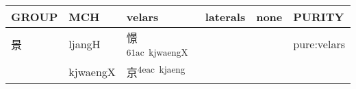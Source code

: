 \documentclass[14pt,a4paper]{scrartcl}
\begin{document}
\begin{longtable}[c]{@{}llllll@{}}
\toprule
\begin{minipage}[b]{0.14\columnwidth}\raggedright\strut
GROUP
\strut\end{minipage} &
\begin{minipage}[b]{0.14\columnwidth}\raggedright\strut
MCH
\strut\end{minipage} &
\begin{minipage}[b]{0.14\columnwidth}\raggedright\strut
velars
\strut\end{minipage} &
\begin{minipage}[b]{0.14\columnwidth}\raggedright\strut
laterals
\strut\end{minipage} &
\begin{minipage}[b]{0.14\columnwidth}\raggedright\strut
none
\strut\end{minipage} &
\begin{minipage}[b]{0.14\columnwidth}\raggedright\strut
PURITY
\strut\end{minipage}\tabularnewline
\midrule
\endhead
\begin{minipage}[t]{0.14\columnwidth}\raggedright\strut
景
\strut\end{minipage} &
\begin{minipage}[t]{0.14\columnwidth}\raggedright\strut
ljangH
\strut\end{minipage} &
\begin{minipage}[t]{0.14\columnwidth}\raggedright\strut
憬\textsuperscript{61ac~kjwaengX}
\strut\end{minipage} &
\begin{minipage}[t]{0.14\columnwidth}\raggedright\strut
\strut\end{minipage} &
\begin{minipage}[t]{0.14\columnwidth}\raggedright\strut
\strut\end{minipage} &
\begin{minipage}[t]{0.14\columnwidth}\raggedright\strut
pure:velars
\strut\end{minipage}\tabularnewline
\begin{minipage}[t]{0.14\columnwidth}\raggedright\strut
𢂋
\strut\end{minipage} &
\begin{minipage}[t]{0.14\columnwidth}\raggedright\strut
kjwaengX
\strut\end{minipage} &
\begin{minipage}[t]{0.14\columnwidth}\raggedright\strut
京\textsuperscript{4eac~kjaeng}
\strut\end{minipage} &

\end{longtable}
\end{document}
